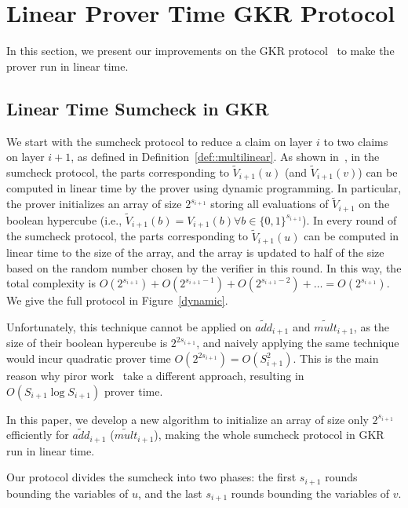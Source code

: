 \section{Linear Prover Time GKR Protocol}
\label{sec::gkrlin}

In this section, we present our improvements on the GKR protocol~\cite{GKR} to make the prover run in linear time. 

\subsection{Linear Time Sumcheck in GKR}

We start with the sumcheck protocol to reduce a claim on layer $i$ to two claims on layer $i+1$, as defined in Definition~\ref{def::multilinear}. As shown in~\cite{CMT}, in the sumcheck protocol, the parts corresponding to $\tilde{V}_{i+1}(u)$ (and $\tilde{V}_{i+1}(v)$) can be computed in linear time by the prover using dynamic programming. In particular, the prover initializes an array of size $2^{s_{i+1}}$ storing all evaluations of $\tilde{V}_{i+1}$ on the boolean hypercube (i.e., $\tilde{V}_{i+1}(b) = V_{i+1}(b) \forall b\in\{0,1\}^{s_{i+1}}$). In every round of the sumcheck protocol, the parts corresponding to $\tilde{V}_{i+1}(u)$ can be computed in linear time to the size of the array, and the array is updated to half of the size based on the random number chosen by the verifier in this round. In this way, the total complexity is $O(2^{s_{i+1}})+ O(2^{s_{i+1}-1}) + O(2^{s_{i+1}-2}) + \ldots = O(2^{s_{i+1}})$. We give the full protocol in Figure~\ref{dynamic}.

Unfortunately, this technique cannot be applied on $\tilde{add}_{i+1}$ and $\tilde{mult}_{i+1}$, as the size of their boolean hypercube is $2^{2s_{i+1}}$, and naively applying the same technique would incur quadratic prover time $O(2^{2s_{i+1}}) = O(S_{i+1}^2)$. This is the main reason why piror work~\cite{CMT,...} take a different approach, resulting in $O(S_{i+1}\log S_{i+1})$ prover time.

In this paper, we develop a new algorithm to initialize an array of size only $2^{s_{i+1}}$ efficiently for $\tilde{add}_{i+1}$ ($\tilde{mult}_{i+1}$), making the whole sumcheck protocol in GKR run in linear time. 

Our protocol divides the sumcheck into two phases: the first $s_{i+1}$ rounds bounding the variables of $u$, and the last $s_{i+1}$ rounds bounding the variables of $v$.

